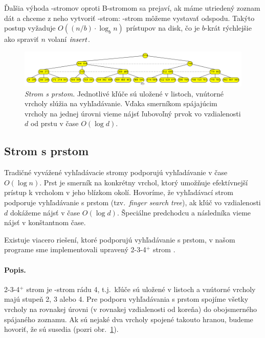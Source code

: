 Ďalšia výhoda \Bp-stromov oproti B-stromom sa prejaví, ak máme utriedený zoznam dát a chceme z neho vytvoriť \Bp-strom:
\Bp-strom môžeme vystavať odspodu. Takýto postup vyžaduje $O((n/b)\cdot\log_b n)$ prístupov na disk,
čo je $b$-krát rýchlejšie ako spraviť $n$ volaní $\mathop{\mathit{insert}}$.

\begin{figure}
\includegraphics[width=2\columnwidth]{obrazky/finger.png}
\caption{\emph{Strom s prstom.} Jednotlivé kľúče sú uložené v listoch, vnútorné vrcholy
slúžia na vyhľadávanie. Vďaka smerníkom spájajúcim vrcholy na jednej úrovni vieme nájsť
ľubovoľný prvok vo vzdialenosti $d$ od prstu v čase $O(\log d)$.}
\label{img:finger}
\end{figure}

\subsection{Strom s prstom}
Tradičné vyvážené vyhľadávacie stromy podporujú vyhľadávanie v čase $O(\log n)$.
Prst je smerník na konkrétny vrchol, ktorý umožňuje efektívnejší prístup k vrcholom
v jeho blízkom okolí. Hovoríme, že vyhľadávací strom podporuje vyhľadávanie s prstom
(tzv.\ \emph{finger search tree}), ak kľúč vo vzdialenosti $d$ dokážeme nájsť v čase $O(\log d)$.
Špeciálne predchodcu a následníka vieme nájsť v konštantnom čase.

Existuje viacero riešení, ktoré podporujú vyhľadávanie s prstom, v našom programe
sme implementovali upravený 2-3-4$^+$ strom \citep{finger}.

\paragraph{Popis.}
2-3-4$^+$ strom je \Bp-strom rádu 4, t.j.\ kľúče sú uložené v listoch a vnútorné vrcholy
majú stupeň 2, 3 alebo 4. Pre podporu vyhľadávania s prstom spojíme všetky vrcholy
na rovnakej úrovni (v rovnakej vzdialenosti od koreňa) do obojsmerného spájaného zoznamu.
Ak sú nejaké dva vrcholy spojené takouto hranou, budeme hovoriť, že sú susedia (pozri
obr.~\ref{img:finger}).


